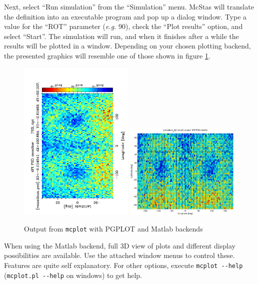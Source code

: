 Next, select ``Run simulation'' from the ``Simulation'' menu.
McStas will translate the definition into an executable program and pop
up a dialog window. Type a value for the ``ROT'' parameter ({\em e.g.}
90), check the ``Plot results'' option, and select ``Start''. The
simulation will run, and when it finishes after a while the results will
be plotted in a window. Depending on your chosen plotting backend, the
presented graphics will resemble one of those shown in figure
\ref{fig:mcplot_figs}.
\begin{figure}[htb!]
  \begin{center}
    \includegraphics[angle=-90,width=0.49\textwidth]{figures/mcplot_PGPLOT}
    \includegraphics[width=0.49\textwidth]{figures/mcplot_Matlab}
  \end{center}
\caption{Output from \texttt{mcplot} with PGPLOT and Matlab backends}
\label{fig:mcplot_figs}
\end{figure}
When using the Matlab backend, full 3D view of plots and different
display possibilities are available. Use the attached \MCS window menus to
control these. Features are quite self explanatory. For other options, execute
\verb+mcplot --help+ (\verb+mcplot.pl --help+ on windows) to get help.

